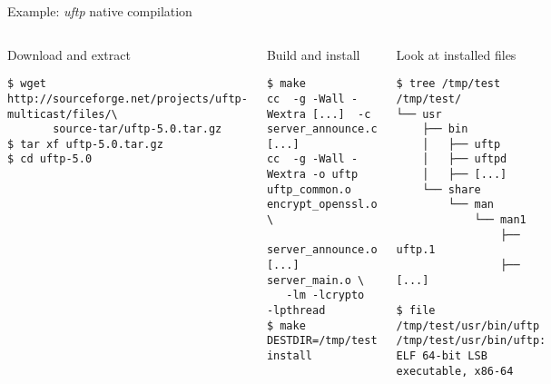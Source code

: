 \begin{frame}[fragile]{Example: {\em uftp} native compilation}
  \begin{columns}
  \begin{block}{Download and extract}
    {\tiny
\begin{verbatim}
$ wget http://sourceforge.net/projects/uftp-multicast/files/\
       source-tar/uftp-5.0.tar.gz
$ tar xf uftp-5.0.tar.gz
$ cd uftp-5.0
\end{verbatim}
    }
  \end{block}

  \begin{block}{Build and install}
    {\tiny
\begin{verbatim}
$ make
cc  -g -Wall -Wextra [...]  -c server_announce.c
[...]
cc  -g -Wall -Wextra -o uftp uftp_common.o encrypt_openssl.o \
   server_announce.o [...] server_main.o \
   -lm -lcrypto  -lpthread
$ make DESTDIR=/tmp/test install
\end{verbatim}
    }
  \end{block}
    \column{0.5\textwidth}
  \begin{block}{Look at installed files}
    {\tiny
\begin{verbatim}
$ tree /tmp/test
/tmp/test/
└── usr
    ├── bin
    │   ├── uftp
    │   ├── uftpd
    │   ├── [...]
    └── share
        └── man
            └── man1
                ├── uftp.1
                ├── [...]

$ file /tmp/test/usr/bin/uftp
/tmp/test/usr/bin/uftp: ELF 64-bit LSB executable, x86-64
\end{verbatim}
    }
  \end{block}
\end{columns}
\end{frame}

